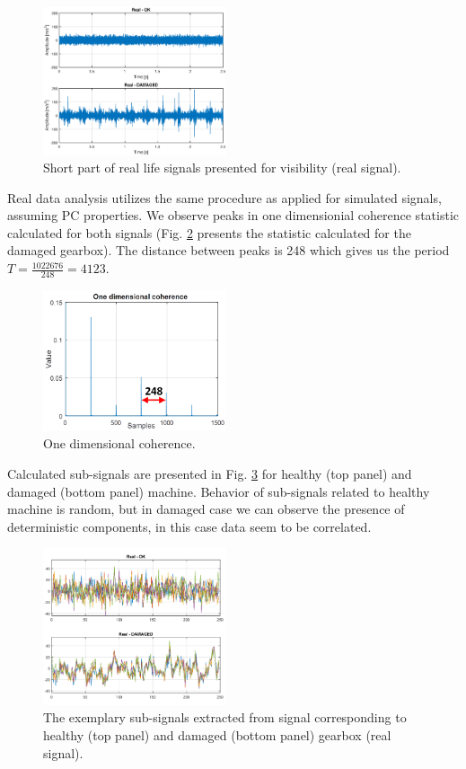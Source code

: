 \documentclass[preprint]{elsarticle}
\begin{document}
\begin{figure}[ht!]
\centering
\includegraphics[width=0.48\textwidth]{wykresy/real_signal_part.eps}
\caption{Short part of real life signals presented for visibility (real signal).}
\label{fig:real_signal_part}
\end{figure}

Real data analysis utilizes the same procedure as applied for simulated signals, assuming PC properties. We observe peaks in one dimensionial coherence statistic calculated for both signals (Fig. \ref{fig:real_coherence} presents the statistic calculated for the damaged gearbox). The distance between peaks is 248 which gives us the period $T=\frac{1022676}{248}=4123$. 

\begin{figure}[ht!]
\centering
\includegraphics[width=0.48\textwidth]{wykresy/real_coherence.png}
\caption{One dimensional coherence.}
\label{fig:real_coherence}
\end{figure}

Calculated sub-signals are presented in Fig. \ref{fig:real_subsignals} for healthy (top panel) and damaged (bottom panel) machine. Behavior of sub-signals related to healthy machine is random, but in damaged case we can observe the presence of deterministic components, in this case data seem to be correlated.

\begin{figure}[ht!]
\centering
\includegraphics[width=0.48\textwidth]{wykresy/real_subsignals.png}
\caption{The exemplary sub-signals extracted from signal corresponding to healthy (top panel) and damaged (bottom panel) gearbox (real signal).}
\label{fig:real_subsignals}
\end{figure}
\end{document}
